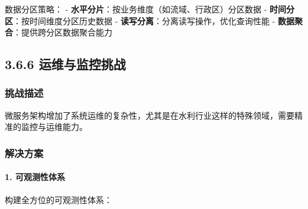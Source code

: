 数据分区策略： - \textbf{水平分片}：按业务维度（如流域、行政区）分区数据
- \textbf{时间分区}：按时间维度分区历史数据 -
\textbf{读写分离}：分离读写操作，优化查询性能 -
\textbf{数据聚合}：提供跨分区数据聚合能力

\subsection{3.6.6
运维与监控挑战}\label{ux8fd0ux7ef4ux4e0eux76d1ux63a7ux6311ux6218}

\subsubsection{挑战描述}\label{ux6311ux6218ux63cfux8ff0-5}

微服务架构增加了系统运维的复杂性，尤其是在水利行业这样的特殊领域，需要精准的监控与运维能力。

\subsubsection{解决方案}\label{ux89e3ux51b3ux65b9ux6848-5}

\paragraph{1. 可观测性体系}\label{ux53efux89c2ux6d4bux6027ux4f53ux7cfb}

构建全方位的可观测性体系：

